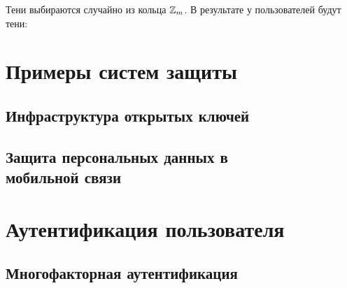 \documentclass[10pt,a4paper]{book}
\newcommand{\exampleend}
\newcommand{\group}[1]{\mathbb{#1}}
\newcommand{\Z}{\group{Z}}
\begin{document}
Тени выбираются случайно из кольца $\mathbb{\Z}_m$. В результате у пользователей будут тени:





\chapter{Примеры систем защиты}



\section{Инфраструктура открытых ключей}











\section[Защита персональных данных в мобильной связи]{Защита персональных данных в \protect\\ мобильной связи}






\chapter{Аутентификация пользователя}


\section{Многофакторная аутентификация}
\end{document}
